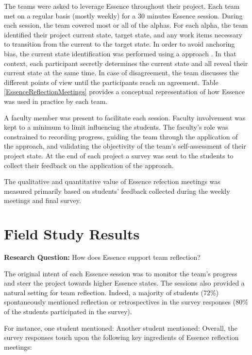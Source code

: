 The teams were asked to leverage Essence throughout their project. Each team met on a regular basis (mostly weekly) for a 30 minutes Essence session. During each session, the team covered most or all of the alphas. For each alpha, the team identified their project current state, target state, and any work items necessary to transition from the current to the target state. In order to avoid anchoring bias, the current state identification was performed using a  approach \cite{ICSE2014}. In that context, each participant secretly determines the current state and all reveal their current state at the same time. In case of disagreement, the team discusses the different points of view until the participants reach an agreement. Table \ref{EssenceReflectionMeetings} provides a conceptual representation of how Essence was used in practice by each team.

A faculty member was present to facilitate each session. Faculty involvement was kept to a minimum to limit influencing the students. The faculty's role was constrained to recording progress, guiding the team through the application of the approach, and validating the objectivity of the team's self-assessment of their project state. At the end of each project a survey was sent to the students to collect their feedback on the application of the approach.

The qualitative and quantitative value of Essence refection meetings was measured primarily based on students' feedback collected during the weekly meetings and final survey.

\section{Field Study Results}
\textbf{Research Question:} How does Essence support team reflection?

The original intent of each Essence session was to monitor the team's progress and steer the project towards higher Essence states. The sessions also provided a natural setting for team reflection. Indeed, a majority of students (72\%) spontaneously mentioned reflection or retrospectives in the survey responses (80\% of the students participated in the survey).

For instance, one student mentioned:  Another student mentioned:  Overall, the survey responses touch upon the following key ingredients of Essence reflection meetings:

